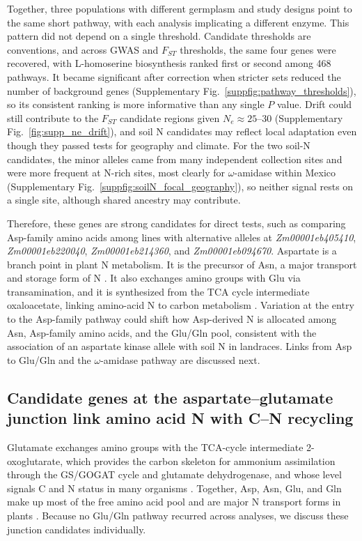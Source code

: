 Together, three populations with different germplasm and study designs point to the same short pathway, with each analysis implicating a different enzyme. This pattern did not depend on a single threshold. Candidate thresholds are conventions, and across GWAS and $F_{ST}$ thresholds, the same four genes were recovered, with L-homoserine biosynthesis ranked first or second among 468 pathways. It became significant after correction when stricter sets reduced the number of background genes (Supplementary Fig.~\ref{suppfig:pathway_thresholds}), so its consistent ranking is more informative than any single $P$ value. Drift could still contribute to the $F_{ST}$ candidate regions given $N_e \approx 25$--30 (Supplementary Fig.~\ref{fig:supp_ne_drift}), and soil N candidates may reflect local adaptation even though they passed tests for geography and climate. For the two soil-N candidates, the minor alleles came from many independent collection sites and were more frequent at N-rich sites, most clearly for $\omega$-amidase within Mexico (Supplementary Fig.~\ref{suppfig:soilN_focal_geography}), so neither signal rests on a single site, although shared ancestry may contribute. 

Therefore, these genes are strong candidates for direct tests, such as comparing Asp-family amino acids among lines with alternative alleles at \textit{Zm00001eb405410}, \textit{Zm00001eb220040}, \textit{Zm00001eb214360}, and \textit{Zm00001eb094670}. Aspartate is a branch point in plant N metabolism. It is the precursor of Asn, a major transport and storage form of N \citep{Lea2007Asparagine}. It also exchanges amino groups with Glu via transamination, and it is synthesized from the TCA cycle intermediate oxaloacetate, linking amino-acid N to carbon metabolism \citep{Han2021Aspartate}. Variation at the entry to the Asp-family pathway could shift how Asp-derived N is allocated among Asn, Asp-family amino acids, and the Glu/Gln pool, consistent with the association of an aspartate kinase allele with soil N in landraces. Links from Asp to Glu/Gln and the $\omega$-amidase pathway are discussed next.

\subsection{Candidate genes at the aspartate--glutamate junction link amino acid N with C--N recycling}

Glutamate exchanges amino groups with the TCA-cycle intermediate 2-oxoglutarate, which provides the carbon skeleton for ammonium assimilation through the GS/GOGAT cycle and glutamate dehydrogenase, and whose level signals C and N status in many organisms \citep{Huergo2015TwoOG}. Together, Asp, Asn, Glu, and Gln make up most of the free amino acid pool and are major N transport forms in plants \citep{McAllister2016AAT}. Because no Glu/Gln pathway recurred across analyses, we discuss these junction candidates individually.

